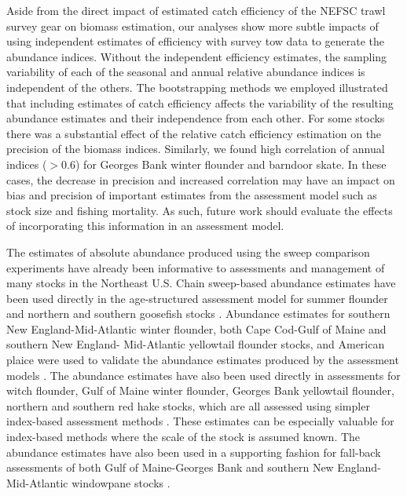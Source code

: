 \documentclass[
  12pt,
]{article}
\begin{document}
Aside from the direct impact of estimated catch efficiency of the NEFSC
trawl survey gear on biomass estimation, our analyses show more subtle
impacts of using independent estimates of efficiency with survey tow
data to generate the abundance indices. Without the independent
efficiency estimates, the sampling variability of each of the seasonal
and annual relative abundance indices is independent of the others. The
bootstrapping methods we employed illustrated that including estimates
of catch efficiency affects the variability of the resulting abundance
estimates and their independence from each other. For some stocks there
was a substantial effect of the relative catch efficiency estimation on
the precision of the biomass indices. Similarly, we found high
correlation of annual indices (\(> 0.6\)) for Georges Bank winter
flounder and barndoor skate. In these cases, the decrease in precision
and increased correlation may have an impact on bias and precision of
important estimates from the assessment model such as stock size and
fishing mortality. As such, future work should evaluate the effects of
incorporating this information in an assessment model.

The estimates of absolute abundance produced using the sweep comparison
experiments have already been informative to assessments and management
of many stocks in the Northeast U.S. Chain sweep-based abundance
estimates have been used directly in the age-structured assessment model
for summer flounder and northern and southern goosefish stocks
\citep{nefsc19, nefsc20b}. Abundance estimates for southern New
England-Mid-Atlantic winter flounder, both Cape Cod-Gulf of Maine and
southern New England- Mid-Atlantic yellowtail flounder stocks, and
American plaice were used to validate the abundance estimates produced
by the assessment models \citep{nefsc20a}. The abundance estimates have
also been used directly in assessments for witch flounder, Gulf of Maine
winter flounder, Georges Bank yellowtail flounder, northern and southern
red hake stocks, which are all assessed using simpler index-based
assessment methods \citep{legaultmccurdy17,nefsc20, nefsc20a}. These
estimates can be especially valuable for index-based methods where the
scale of the stock is assumed known. The abundance estimates have also
been used in a supporting fashion for fall-back assessments of both Gulf
of Maine-Georges Bank and southern New England-Mid-Atlantic windowpane
stocks \citep{nefsc20a}.
\end{document}
